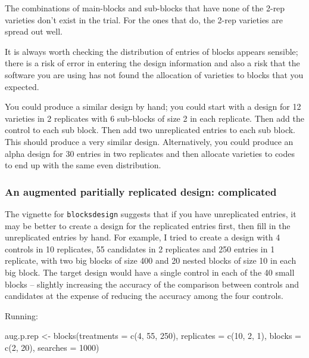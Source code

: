 \documentclass[
]{book}
\newenvironment{Shaded}{\begin{snugshade}}{\end{snugshade}}
\newcommand{\AttributeTok}[1]{\textcolor[rgb]{0.77,0.63,0.00}{#1}}
\newcommand{\DecValTok}[1]{\textcolor[rgb]{0.00,0.00,0.81}{#1}}
\newcommand{\FunctionTok}[1]{\textcolor[rgb]{0.00,0.00,0.00}{#1}}
\newcommand{\NormalTok}[1]{#1}
\newcommand{\OtherTok}[1]{\textcolor[rgb]{0.56,0.35,0.01}{#1}}
\begin{document}
The combinations of main-blocks and sub-blocks that have none of the 2-rep varieties don't exist in the trial. For the ones that do, the 2-rep varieties are spread out well.

It is always worth checking the distribution of entries of blocks appears sensible; there is a risk of error in entering the design information and also a risk that the software you are using has not found the allocation of varieties to blocks that you expected.

You could produce a similar design by hand; you could start with a design for 12 varieties in 2 replicates with 6 sub-blocks of size 2 in each replicate. Then add the control to each sub block. Then add two unreplicated entries to each sub block. This should produce a very similar design. Alternatively, you could produce an alpha design for 30 entries in two replicates and then allocate varieties to codes to end up with the same even distribution.

\hypertarget{an-augmented-paritially-replicated-design-complicated}{%
\subsubsection{An augmented paritially replicated design: complicated}\label{an-augmented-paritially-replicated-design-complicated}}

The vignette for \texttt{blocksdesign} suggests that if you have unreplicated entries, it may be better to create a design for the replicated entries first, then fill in the unreplicated entries by hand. For example, I tried to create a design with 4 controls in 10 replicates, 55 candidates in 2 replicates and 250 entries in 1 replicate, with two big blocks of size 400 and 20 nested blocks of size 10 in each big block. The target design would have a single control in each of the 40 small blocks -- slightly increasing the accuracy of the comparison between controls and candidates at the expense of reducing the accuracy among the four controls.

Running:

\begin{Shaded}
\begin{Highlighting}[]
\NormalTok{aug.p.rep }\OtherTok{\textless{}{-}} \FunctionTok{blocks}\NormalTok{(}\AttributeTok{treatments =} \FunctionTok{c}\NormalTok{(}\DecValTok{4}\NormalTok{, }\DecValTok{55}\NormalTok{, }\DecValTok{250}\NormalTok{), }\AttributeTok{replicates =} \FunctionTok{c}\NormalTok{(}\DecValTok{10}\NormalTok{, }
    \DecValTok{2}\NormalTok{, }\DecValTok{1}\NormalTok{), }\AttributeTok{blocks =} \FunctionTok{c}\NormalTok{(}\DecValTok{2}\NormalTok{, }\DecValTok{20}\NormalTok{), }\AttributeTok{searches =} \DecValTok{1000}\NormalTok{)}
\end{Highlighting}
\end{Shaded}
\end{document}
